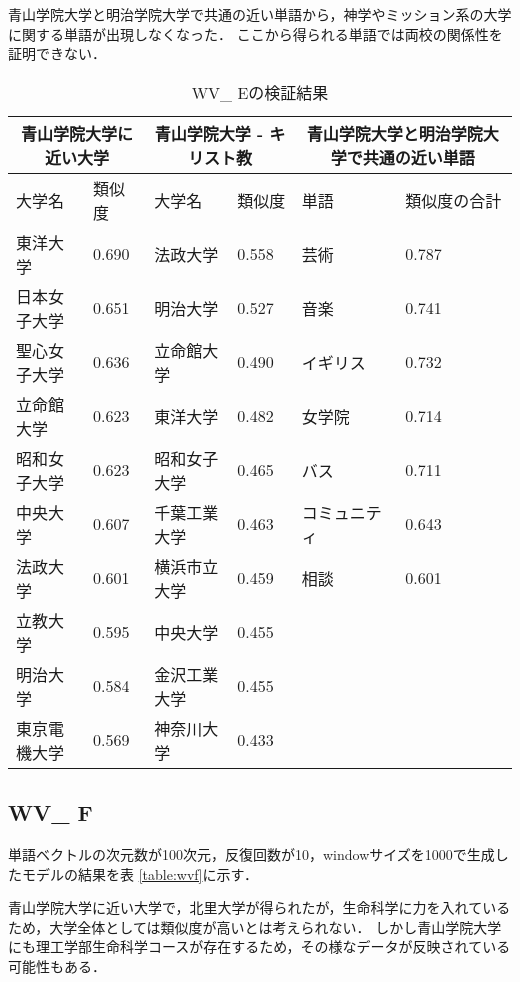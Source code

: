 青山学院大学と明治学院大学で共通の近い単語から，神学やミッション系の大学に関する単語が出現しなくなった．
ここから得られる単語では両校の関係性を証明できない．

\begin{table}[H]
\caption{WV\_ Eの検証結果}
\centering
\footnotesize
\begin{tabular}{ll|ll|ll}
\hline
\multicolumn{2}{c}{青山学院大学に近い大学} & \multicolumn{2}{c}{青山学院大学 - キリスト教} & \multicolumn{2}{c}{青山学院大学と明治学院大学で共通の近い単語}
\\ \hline
大学名 & 類似度 & 大学名 & 類似度 & 単語 & 類似度の合計
\\ \hline \hline
東洋大学 & 0.690 & 法政大学 & 0.558 & 芸術 & 0.787\\
日本女子大学 & 0.651 & 明治大学 & 0.527 & 音楽 & 0.741\\
聖心女子大学 & 0.636 & 立命館大学 & 0.490 & イギリス & 0.732\\
立命館大学 & 0.623 & 東洋大学 & 0.482 & 女学院 & 0.714\\
昭和女子大学 & 0.623 & 昭和女子大学 & 0.465 & バス & 0.711\\
中央大学 & 0.607 & 千葉工業大学 & 0.463 & コミュニティ & 0.643\\
法政大学 & 0.601 & 横浜市立大学 & 0.459 & 相談 & 0.601\\
立教大学 & 0.595 & 中央大学 & 0.455 & & \\
明治大学 & 0.584 & 金沢工業大学 & 0.455 & & \\
東京電機大学 & 0.569 & 神奈川大学 & 0.433 & & \\ \hline
\end{tabular}
\label{table:wve}
\end{table}

\subsection{WV\_ F}
単語ベクトルの次元数が100次元，反復回数が10，windowサイズを1000で生成したモデルの結果を表 \ref{table:wvf}に示す．

青山学院大学に近い大学で，北里大学が得られたが，生命科学に力を入れているため，大学全体としては類似度が高いとは考えられない．
しかし青山学院大学にも理工学部生命科学コースが存在するため，その様なデータが反映されている可能性もある．

